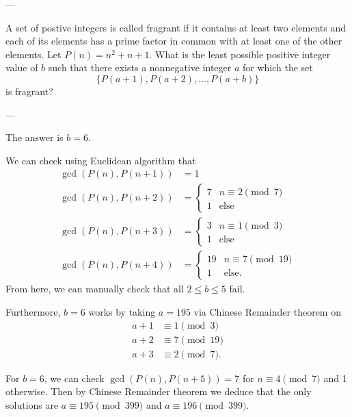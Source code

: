 
---

A set of postive integers is called fragrant if it contains at least two elements and each of its elements has a prime factor in common with at least one of the other elements. Let $P(n)=n^2+n+1$. What is the least possible positive integer value of $b$ such that there exists a nonnegative integer $a$ for which the set
\[\{P(a+1),P(a+2),\ldots,P(a+b)\}\]
is fragrant?

---

The answer is $b=6$.

We can check using Euclidean algorithm that
\begin{align*}
    \gcd(P(n),P(n+1))&=1\\
    \gcd(P(n),P(n+2))&=\begin{cases}7&n\equiv2\pmod7\\1&\text{else}\end{cases}\\
    \gcd(P(n),P(n+3))&=\begin{cases}3&n\equiv1\pmod3\\1&\text{else}\end{cases}\\
    \gcd(P(n),P(n+4))&=\begin{cases}19&n\equiv7\pmod{19}\\1&\text{else.}\end{cases}
\end{align*}
From here, we can manually check that all $2\le b\le5$ fail.

Furthermore, $b=6$ works by taking $a=195$ via Chinese Remainder theorem on
\begin{align*}
    a+1&\equiv1\pmod3\\
    a+2&\equiv7\pmod{19}\\
    a+3&\equiv2\pmod7.
\end{align*}
\begin{remark}
    For $b=6$, we can check $\gcd(P(n),P(n+5))=7$ for $n\equiv4\pmod7$ and 1 otherwise. Then by Chinese Remainder theorem we deduce that the only solutions are $a\equiv195\pmod{399}$ and $a\equiv196\pmod{399}$.
\end{remark}

